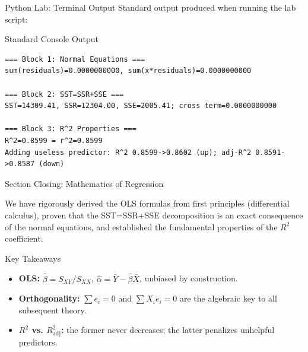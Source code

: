 \documentclass[10pt, aspectratio=169]{beamer}
\begin{document}
\begin{frame}[fragile]{Python Lab: Terminal Output}
  \scriptsize
  Standard output produced when running the lab script:
  \vspace{0.02cm}
  \begin{block}{Standard Console Output}
    \fontsize{3.6pt}{4.3pt}\selectfont
    \begin{verbatim}
=== Block 1: Normal Equations ===
sum(residuals)=0.0000000000, sum(x*residuals)=0.0000000000

=== Block 2: SST=SSR+SSE ===
SST=14309.41, SSR=12304.00, SSE=2005.41; cross term=0.0000000000

=== Block 3: R^2 Properties ===
R^2=0.8599 = r^2=0.8599
Adding useless predictor: R^2 0.8599->0.8602 (up); adj-R^2 0.8591->0.8587 (down)
    \end{verbatim}
  \end{block}
\end{frame}


\begin{frame}{Section Closing: Mathematics of Regression}
  \begin{reflexion}
    We have rigorously derived the OLS formulas from first principles (differential calculus), proven that the SST=SSR+SSE decomposition is an exact consequence of the normal equations, and established the fundamental properties of the $R^2$ coefficient.
  \end{reflexion}

  \vspace{0.2cm}
  \pause
  \begin{block}{Key Takeaways}
    \begin{itemize}\itemsep=0.08cm
      \item \textbf{OLS:} $\hat\beta=S_{XY}/S_{XX}$, $\hat\alpha=\bar Y-\hat\beta\bar X$, unbiased by construction.
      \item \textbf{Orthogonality:} $\sum e_i=0$ and $\sum X_ie_i=0$ are the algebraic key to all subsequent theory.
      \item \textbf{$R^2$ vs. $R^2_{\text{adj}}$:} the former never decreases; the latter penalizes unhelpful predictors.
    \end{itemize}
  \end{block}
\end{frame}
\end{document}
